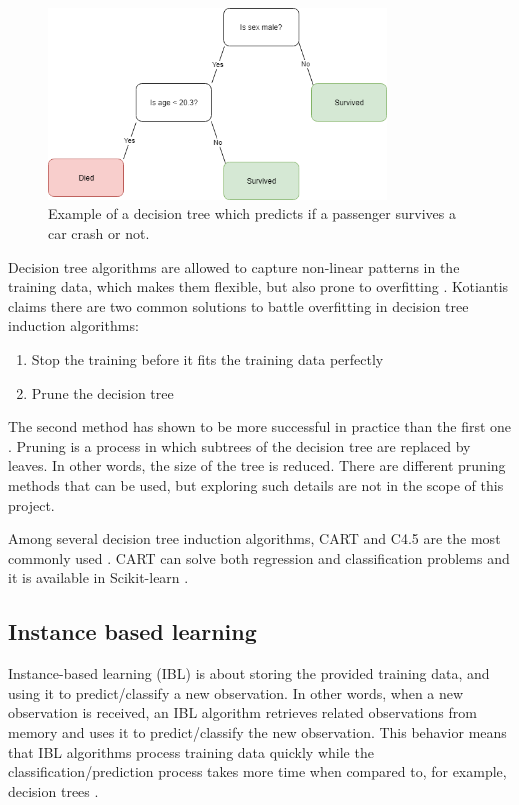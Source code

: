 \begin{figure}[H] 
	\centering
	\includegraphics[width=0.8\textwidth]{media/decisiontree_example.png}
	\caption{Example of a decision tree which predicts if a passenger survives a car crash or not.}
	\label{fig:decisiontree_example}
\end{figure}

		Decision tree algorithms are allowed to capture non-linear patterns in the training data, which makes them flexible, but also prone to overfitting \cite{BOOK:7}. Kotiantis \cite{ARTICLE:7} claims there are two common solutions to battle overfitting in decision tree induction algorithms:
		\begin{enumerate}
			\item Stop the training before it fits the training data perfectly
			\item Prune the decision tree
		\end{enumerate}
		The second method has shown to be more successful in practice than the first one \cite{BOOK:8}. Pruning is a process in which subtrees of the decision tree are replaced by leaves. In other words, the size of the tree is reduced. There are different pruning methods that can be used, but exploring such details are not in the scope of this project.

		 Among several decision tree induction algorithms, CART and C4.5 are the most commonly used \cite{BOOK:8}. CART can solve both regression and classification problems and it is available in Scikit-learn \cite{WEBSITE:16}. %
		
	\subsection{Instance based learning}
	Instance-based learning (IBL) is about storing the provided training data, and using it to predict/classify a new observation. In other words, when a new observation is received, an IBL algorithm retrieves related observations from memory and uses it to predict/classify the new observation. This behavior means that IBL algorithms process training data quickly while the classification/prediction process takes more time when compared to, for example, decision trees \cite{ARTICLE:8}. 

